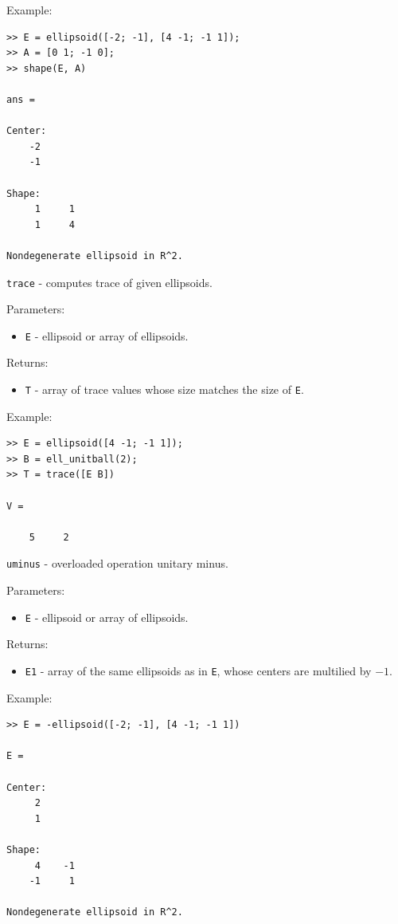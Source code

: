 \documentclass{report}
\begin{document}
Example:
{\tt \begin{verbatim}
>> E = ellipsoid([-2; -1], [4 -1; -1 1]);
>> A = [0 1; -1 0];
>> shape(E, A)

ans =

Center:
    -2
    -1

Shape:
     1     1
     1     4

Nondegenerate ellipsoid in R^2.
\end{verbatim} }

\newpage

{\Large {\tt trace}} - computes trace of given ellipsoids.

Parameters:
\begin{itemize}
\item {\tt E} - ellipsoid or array of ellipsoids.
\end{itemize}

Returns:
\begin{itemize}
\item {\tt T} - array of trace values whose size matches the size of {\tt E}.
\end{itemize}

Example:
{\tt \begin{verbatim}
>> E = ellipsoid([4 -1; -1 1]);
>> B = ell_unitball(2);
>> T = trace([E B])

V =

    5     2
\end{verbatim} }

\newpage


{\Large {\tt uminus}} - overloaded operation unitary minus.

Parameters:
\begin{itemize}
\item {\tt E} - ellipsoid or array of ellipsoids.
\end{itemize}

Returns:
\begin{itemize}
\item {\tt E1} - array of the same ellipsoids as in {\tt E}, whose centers
are multilied by $-1$.
\end{itemize}

Example:
{\tt \begin{verbatim}
>> E = -ellipsoid([-2; -1], [4 -1; -1 1])

E =

Center:
     2
     1

Shape:
     4    -1
    -1     1

Nondegenerate ellipsoid in R^2.
\end{verbatim} }
\end{document}
